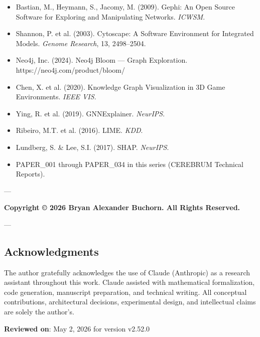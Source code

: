 \begin{itemize}
\item [gephi2009] Bastian, M., Heymann, S., Jacomy, M. (2009). Gephi: An Open Source Software for Exploring and Manipu\-lating Networks. \textit{ICWSM}.
\item [cytoscape\-2003\-] Shannon, P. et al. (2003). Cytoscape: A Software Environment for Integrated Models. \textit{Genome Research}, 13, 2498–2504.
\item [neo4j2024bloom] Neo4j, Inc. (2024). Neo4j Bloom — Graph Exploration. https://neo4j.com/product/bloom/
\item [chen\-2020\-kg3d] Chen, X. et al. (2020). Knowledge Graph Visual\-ization in 3D Game Enviro\-nments. \textit{IEEE VIS}.
\item [ying\-2019\-gnnex\-plainer] Ying, R. et al. (2019). GNNExplainer. \textit{NeurIPS}.
\item [ribeiro\-2016\-lime] Ribeiro, M.T. et al. (2016). LIME. \textit{KDD}.
\item [lundberg\-2017\-shap] Lundberg, S. \& Lee, S.I. (2017). SHAP. \textit{NeurIPS}.
\item PAPER\_001 through PAPER\_034 in this series (CEREBRUM Technical Reports).

\end{itemize}
---

\textbf{Copyright © 2026 Bryan Alexander Buchorn. All Rights Reserved.}

---
\subsection{Acknow\-ledgments}

The author gratefully ackno\-wledges the use of Claude (Anthropic) as a research assistant throughout this work. Claude assisted with mathe\-matical forma\-lization, code generation, manuscript preparation, and technical writing. All conceptual contr\-ibutions, archi\-tectural decisions, exper\-imental design, and intel\-lectual claims are solely the author's.

\textbf{Reviewed on}: May 2, 2026 for version v2.52.0
